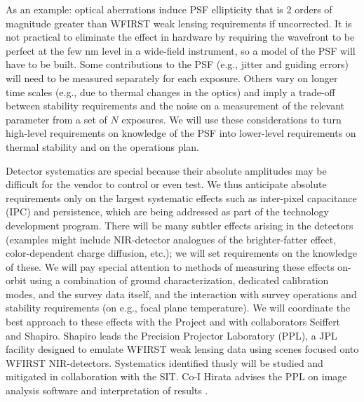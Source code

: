 As an example: optical aberrations induce PSF ellipticity that is 2 orders of magnitude
greater than WFIRST weak lensing requirements if uncorrected. It is not practical to
eliminate the effect in hardware by requiring the wavefront to be perfect at the few nm
level in a wide-field instrument, so a model of the PSF will have to be built.
Some contributions to the PSF (e.g., jitter and guiding errors) will need to be measured separately for each
exposure. Others vary on longer time scales (e.g., due to thermal changes in the optics)
and imply a trade-off between stability requirements
and the noise on a measurement of the relevant parameter from a set of $N$ exposures.
We will use these considerations to turn high-level requirements on knowledge of the PSF into
lower-level requirements on thermal stability and on the operations plan.

Detector systematics are special because their absolute amplitudes may be difficult for the vendor to control or even test.
We thus anticipate absolute
requirements only on the largest systematic effects such as inter-pixel capacitance (IPC) and persistence, which are
being addressed as part of the technology development program. There will be many subtler
effects arising in the detectors
(examples might include NIR-detector analogues of the brighter-fatter effect,
color-dependent charge diffusion, etc.); we will set requirements on the knowledge of these.
We will pay special attention to methods of measuring these effects on-orbit using a combination of
ground characterization, dedicated calibration modes, and the survey data itself,
and the interaction with survey operations and stability requirements (on e.g., focal plane temperature).
We will coordinate the best approach to these effects with the Project
and with collaborators Seiffert and Shapiro.  Shapiro leads the
Precision Projector Laboratory (PPL), a JPL facility designed to
emulate WFIRST weak lensing data using scenes focused onto WFIRST
NIR-detectors.  Systematics identified thusly will be studied and
mitigated in collaboration with the SIT.  Co-I Hirata advises the PPL on
image analysis software and interpretation of results \cite{Rowe:2011wj, Seshadri:2013xla}.


